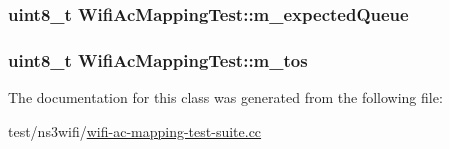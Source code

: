 \subsubsection[{\texorpdfstring{m\+\_\+expected\+Queue}{m_expectedQueue}}]{\setlength{\rightskip}{0pt plus 5cm}uint8\+\_\+t Wifi\+Ac\+Mapping\+Test\+::m\+\_\+expected\+Queue\hspace{0.3cm}{\ttfamily [private]}}\hypertarget{classWifiAcMappingTest_a8f3ed274153f2ff1568b9fedb07a1185}{}\label{classWifiAcMappingTest_a8f3ed274153f2ff1568b9fedb07a1185}
\subsubsection[{\texorpdfstring{m\+\_\+tos}{m_tos}}]{\setlength{\rightskip}{0pt plus 5cm}uint8\+\_\+t Wifi\+Ac\+Mapping\+Test\+::m\+\_\+tos\hspace{0.3cm}{\ttfamily [private]}}\hypertarget{classWifiAcMappingTest_a9e987a3d809f54cf531580fbad93e08c}{}\label{classWifiAcMappingTest_a9e987a3d809f54cf531580fbad93e08c}


The documentation for this class was generated from the following file\+:\begin{DoxyCompactItemize}
\item 
test/ns3wifi/\hyperlink{wifi-ac-mapping-test-suite_8cc}{wifi-\/ac-\/mapping-\/test-\/suite.\+cc}\end{DoxyCompactItemize}
